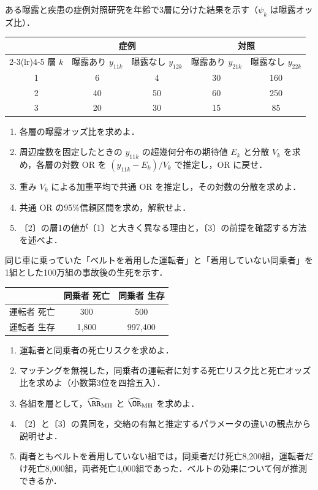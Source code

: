 \begin{reidai}\label{reidai:m07-2}
ある曝露と疾患の症例対照研究を年齢で3層に分けた結果を示す（$\psi_k$ は曝露オッズ比）．
\begin{center}\small
\begin{tabular}{@{}ccccc@{}}
\toprule
 & \multicolumn{2}{c}{症例} & \multicolumn{2}{c}{対照}\\
\cmidrule(lr){2-3}\cmidrule(lr){4-5}
層 $k$ & 曝露あり $y_{11k}$ & 曝露なし $y_{12k}$ & 曝露あり $y_{21k}$ & 曝露なし $y_{22k}$\\
\midrule
1 & 6 & 4 & 30 & 160\\
2 & 40 & 50 & 60 & 250\\
3 & 20 & 30 & 15 & 85\\
\bottomrule
\end{tabular}
\end{center}
\begin{enumerate}[label=〔\arabic*〕]
\item 各層の曝露オッズ比を求めよ．
\item 周辺度数を固定したときの $y_{11k}$ の超幾何分布の期待値 $E_k$ と分散 $V_k$ を求め，各層の対数 OR を $(y_{11k}-E_k)/V_k$ で推定し，OR に戻せ．
\item 重み $V_k$ による加重平均で共通 OR を推定し，その対数の分散を求めよ．
\item 共通 OR の95\%信頼区間を求め，解釈せよ．
\item 〔2〕の層1の値が〔1〕と大きく異なる理由と，〔3〕の前提を確認する方法を述べよ．
\end{enumerate}
\end{reidai}

\begin{reidai}\label{reidai:m07-3}
同じ車に乗っていた「ベルトを着用した運転者」と「着用していない同乗者」を1組とした100万組の事故後の生死を示す．
\begin{center}\small
\begin{tabular}{@{}lcc@{}}
\toprule
 & 同乗者 死亡 & 同乗者 生存\\
\midrule
運転者 死亡 & 300 & 500\\
運転者 生存 & 1{,}800 & 997{,}400\\
\bottomrule
\end{tabular}
\end{center}
\begin{enumerate}[label=〔\arabic*〕]
\item 運転者と同乗者の死亡リスクを求めよ．
\item マッチングを無視した，同乗者の運転者に対する死亡リスク比と死亡オッズ比を求めよ（小数第3位を四捨五入）．
\item 各組を層として，$\widehat\RR_{\mathrm{MH}}$ と $\widehat\OR_{\mathrm{MH}}$ を求めよ．
\item 〔2〕と〔3〕の異同を，交絡の有無と推定するパラメータの違いの観点から説明せよ．
\item 両者ともベルトを着用していない組では，同乗者だけ死亡8{,}200組，運転者だけ死亡8{,}000組，両者死亡4{,}000組であった．ベルトの効果について何が推測できるか．
\end{enumerate}
\end{reidai}

